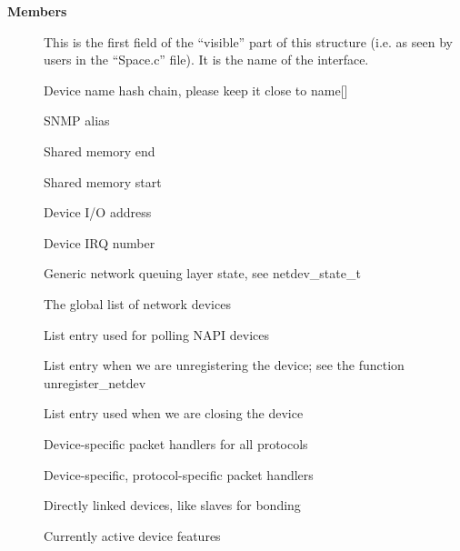 \documentclass[a4paper,8pt,english]{sphinxmanual}
\begin{document}
\textbf{Members}
\begin{description}
\item[{}] \leavevmode
This is the first field of the ``visible'' part of this structure
(i.e. as seen by users in the ``Space.c'' file).  It is the name
of the interface.

\item[{}] \leavevmode
Device name hash chain, please keep it close to name{[}{]}

\item[{}] \leavevmode
SNMP alias

\item[{}] \leavevmode
Shared memory end

\item[{}] \leavevmode
Shared memory start

\item[{}] \leavevmode
Device I/O address

\item[{}] \leavevmode
Device IRQ number

\item[{}] \leavevmode
Generic network queuing layer state, see netdev\_state\_t

\item[{}] \leavevmode
The global list of network devices

\item[{}] \leavevmode
List entry used for polling NAPI devices

\item[{}] \leavevmode
List entry  when we are unregistering the
device; see the function unregister\_netdev

\item[{}] \leavevmode
List entry used when we are closing the device

\item[{}] \leavevmode
Device-specific packet handlers for all protocols

\item[{}] \leavevmode
Device-specific, protocol-specific packet handlers

\item[{}] \leavevmode
Directly linked devices, like slaves for bonding

\item[{}] \leavevmode
Currently active device features


\end{description}
\end{document}
